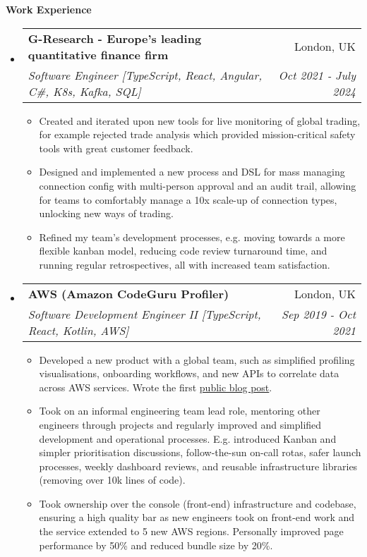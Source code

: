 \documentclass[letterpaper,11pt]{article}
\makeatletter
\newcommand{\resitem}[1]{\item #1 \vspace{-2pt}}
\newcommand{\resheading}[1]{{\large \colorbox{mygrey}{\begin{minipage}{\textwidth}{\textbf{#1 \vphantom{p\^{E}}}}\end{minipage}}}}
\newcommand{\ressubheading}[4]{
\begin{tabular*}{7.0in}{l@{\extracolsep{\fill}}r}
	\textbf{#1} & #2 \\
	\textit{#3} & \textit{#4} \\
\end{tabular*}\vspace{-6pt}}
\makeatother
\begin{document}
	\resheading{Work Experience}
	\begin{itemize}
		\item
		\ressubheading{G-Research - Europe's leading quantitative finance firm}{London, UK}{Software Engineer [TypeScript, React, Angular, C\#, K8s, Kafka, SQL]}{Oct 2021 - July 2024}
		\begin{itemize}
			\resitem{Created and iterated upon new tools for live monitoring of global trading, for example rejected trade analysis which provided mission-critical safety tools with great customer feedback.}
			\resitem{Designed and implemented a new process and DSL for mass managing connection config with multi-person approval and an audit trail, allowing for teams to comfortably manage a 10x scale-up of connection types, unlocking new ways of trading.}
			\resitem{Refined my team's development processes, e.g. moving towards a more flexible kanban model, reducing code review turnaround time, and running regular retrospectives, all with increased team satisfaction.}
		\end{itemize}

		\item
		\ressubheading{AWS (Amazon CodeGuru Profiler)}{London, UK}{Software Development Engineer II [TypeScript, React, Kotlin, AWS]}{Sep 2019 - Oct 2021}
		\begin{itemize}
			\resitem{Developed a new product with a global team, such as simplified profiling visualisations, onboarding workflows, and new APIs to correlate data across AWS services. Wrote the first \href{https://aws.amazon.com/blogs/machine-learning/optimizing-application-performance-with-amazon-codeguru-profiler/}{public blog post}.}
			\resitem{Took on an informal engineering team lead role, mentoring other engineers through projects and regularly improved and simplified development and operational processes. E.g. introduced Kanban and simpler prioritisation discussions, follow-the-sun on-call rotas, safer launch processes, weekly dashboard reviews, and reusable infrastructure libraries (removing over 10k lines of code).}
			\resitem{Took ownership over the console (front-end) infrastructure and codebase, ensuring a high quality bar as new engineers took on front-end work and the service extended to 5 new AWS regions. Personally improved page performance by 50\% and reduced bundle size by 20\%.}
		\end{itemize}


\end{itemize}
\end{document}
